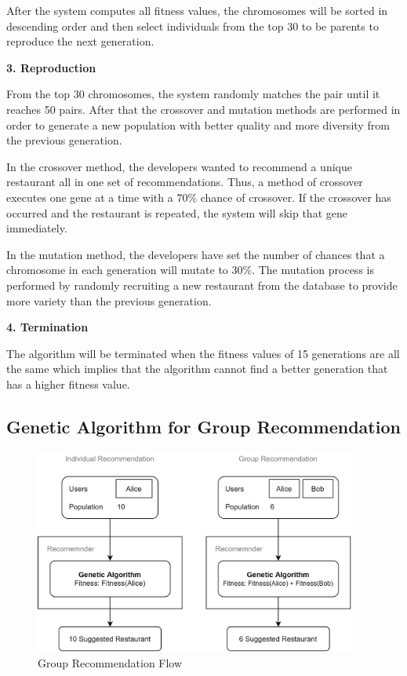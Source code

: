 \documentclass[12pt,oneside,openright,a4paper]{cpe-english-project}
\begin{document}
After the system computes all fitness values, the chromosomes will be sorted in descending order and then select individuals from the top 30 to be parents to reproduce the next generation.

\textbf{3. Reproduction}\par

From the top 30 chromosomes, the system randomly matches the pair until it reaches 50 pairs. After that the crossover and mutation methods are performed in order to generate a new population with better quality and more diversity from the previous generation.

In the crossover method, the developers wanted to recommend a unique restaurant all in one set of recommendations. Thus, a method of crossover executes one gene at a time with a 70\% chance of crossover. If the crossover has occurred and the restaurant is repeated, the system will skip that gene immediately.

In the mutation method, the developers have set the number of chances that a chromosome in each generation will mutate to 30\%. The mutation process is performed by randomly recruiting a new restaurant from the database to provide more variety than the previous generation.

\textbf{4. Termination}\par

The algorithm will be terminated when the fitness values of 15 generations are all the same which implies that the algorithm cannot find a better generation that has a higher fitness value.

\subsection{Genetic Algorithm for Group Recommendation}

\begin{figure}[H]\centering
\includegraphics[width=300pt]{./images/3ga_grouprecflow.png}
\caption{Group Recommendation Flow}\label{fig:3ga_grouprecflow}
\end{figure}\vspace{-24pt}
\end{document}
